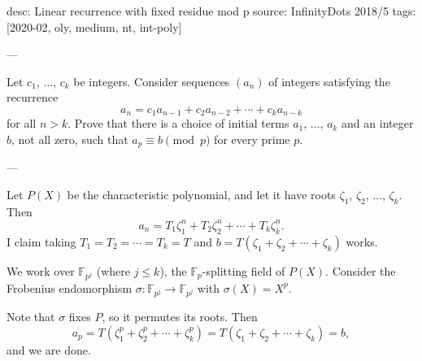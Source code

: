 desc: Linear recurrence with fixed residue mod p
source: InfinityDots 2018/5
tags: [2020-02, oly, medium, nt, int-poly]

---

Let $c_1$, $\ldots$, $c_k$ be integers. Consider sequences $(a_n)$ of integers satisfying the recurrence \[a_n=c_1a_{n-1}+c_2a_{n-2}+\cdots+c_ka_{n-k}\]
for all $n>k$. Prove that there is a choice of initial terms $a_1$, $\ldots$, $a_k$ and an integer $b$, not all zero, such that $a_p\equiv b\pmod p$ for every prime $p$.

---

Let $P(X)$ be the characteristic polynomial, and let it have roots $\zeta_1$, $\zeta_2$, $\ldots$, $\zeta_k$. Then \[a_n=T_1\zeta_1^n+T_2\zeta_2^n+\cdots+T_k\zeta_k^n.\]
I claim taking $T_1=T_2=\cdots=T_k=T$ and $b=T(\zeta_1+\zeta_2+\cdots+\zeta_k)$ works.

We work over $\mathbb F_{p^j}$ (where $j\le k$), the $\mathbb F_p$-splitting field of $P(X)$. Consider the Frobenius endomorphism $\sigma:\mathbb F_{p^j}\to\mathbb F_{p^j}$ with $\sigma(X)=X^p$.

Note that $\sigma$ fixes $P$, so it permutes its roots. Then \[a_p=T\left(\zeta_1^p+\zeta_2^p+\cdots+\zeta_k^p\right)=T(\zeta_1+\zeta_2+\cdots+\zeta_k)=b,\]
and we are done.
